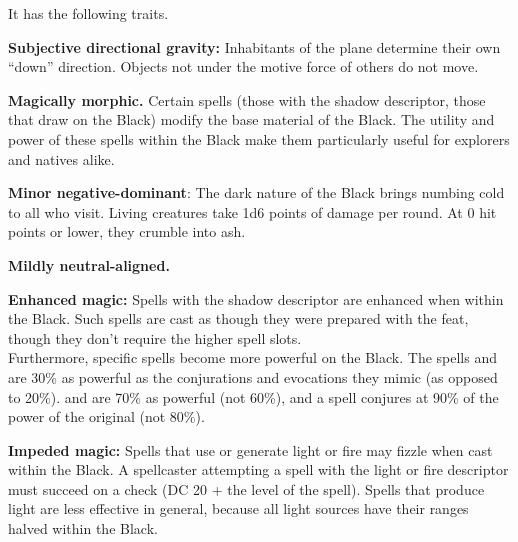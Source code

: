 It has the following traits.
\begin{itemize*}
\item \textbf{Subjective directional gravity:} Inhabitants of the plane determine their own ``down'' direction. Objects not under the motive force of others do not move.
\item \textbf{Magically morphic.} Certain spells (those with the shadow descriptor, those that draw on the Black) modify the base material of the Black. The utility and power of these spells within the Black make them particularly useful for explorers and natives alike.
\item \textbf{Minor negative-dominant}: The dark nature of the Black brings numbing cold to all who visit. Living creatures take 1d6 points of damage per round. At 0 hit points or lower, they crumble into ash.
\item \textbf{Mildly neutral-aligned.}
\item \textbf{Enhanced magic:} Spells with the shadow descriptor are enhanced when within the Black. Such spells are cast as though they were prepared with the  feat, though they don't require the higher spell slots.\\

Furthermore, specific spells become more powerful on the Black. The spells  and  are 30\% as powerful as the conjurations and evocations they mimic (as opposed to 20\%).  and  are 70\% as powerful (not 60\%), and a  spell conjures at 90\% of the power of the original (not 80\%).

\item \textbf{Impeded magic:} Spells that use or generate light or fire may fizzle when cast within the Black. A spellcaster attempting a spell with the light or fire descriptor must succeed on a  check (DC 20 + the level of the spell). Spells that produce light are less effective in general, because all light sources have their ranges halved within the Black.
\end{itemize*}
